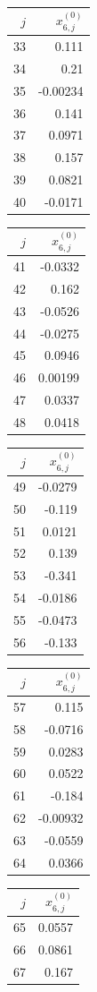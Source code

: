 {\begin{tabular}[t]{r|r}
$j$ & $x^{(0)}_{6,j}$ \\\hline
33 & 0.111 \\
34 & 0.21 \\
35 & -0.00234 \\
36 & 0.141 \\
37 & 0.0971 \\
38 & 0.157 \\
39 & 0.0821 \\
40 & -0.0171
\end{tabular}\kern4pt
\begin{tabular}[t]{r|r}
$j$ & $x^{(0)}_{6,j}$ \\\hline
41 & -0.0332 \\
42 & 0.162 \\
43 & -0.0526 \\
44 & -0.0275 \\
45 & 0.0946 \\
46 & 0.00199 \\
47 & 0.0337 \\
48 & 0.0418
\end{tabular}\kern4pt
\begin{tabular}[t]{r|r}
$j$ & $x^{(0)}_{6,j}$ \\\hline
49 & -0.0279 \\
50 & -0.119 \\
51 & 0.0121 \\
52 & 0.139 \\
53 & -0.341 \\
54 & -0.0186 \\
55 & -0.0473 \\
56 & -0.133
\end{tabular}\kern4pt
\begin{tabular}[t]{r|r}
$j$ & $x^{(0)}_{6,j}$ \\\hline
57 & 0.115 \\
58 & -0.0716 \\
59 & 0.0283 \\
60 & 0.0522 \\
61 & -0.184 \\
62 & -0.00932 \\
63 & -0.0559 \\
64 & 0.0366
\end{tabular}\kern4pt
\begin{tabular}[t]{r|r}
$j$ & $x^{(0)}_{6,j}$ \\\hline
65 & 0.0557 \\
66 & 0.0861 \\
67 & 0.167 \\

\end{tabular}}
